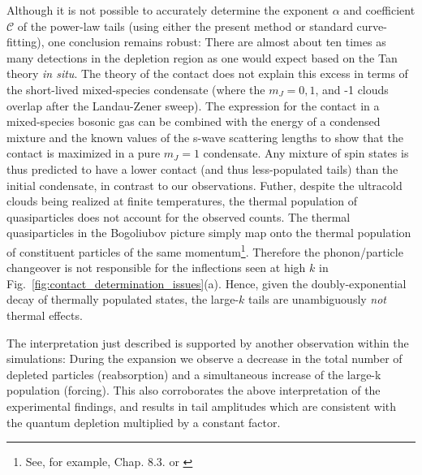 {	Although it is not possible to accurately determine the  exponent $\alpha$ and coefficient $\mathcal{C}$ of the power-law tails (using either the present method or standard curve-fitting), one conclusion remains robust: There are {almost} about ten times as many detections in the depletion region as one would expect based on the Tan theory {\emph{in situ}}. 
	The theory of the contact does not explain this excess in terms of the short-lived mixed-species condensate (where the $m_J=0,1$, and -1 clouds overlap after the Landau-Zener sweep). 
	The expression for the contact in a mixed-species bosonic gas \cite{Werner12_boson} can be combined with the energy of a condensed mixture \cite{PethickSmith} and the known values of the s-wave scattering lengths \cite{Vassen16} to show that the contact is maximized in a pure $m_J=1$ condensate.
	Any mixture of spin states is thus predicted to have a lower contact (and thus less-populated tails) than the initial condensate, in contrast to our observations.
	Futher, despite the ultracold clouds being realized at finite temperatures, the thermal population of quasiparticles does not account for the observed counts. 
	The thermal quasiparticles in the Bogoliubov picture simply map onto the thermal population of constituent particles of the same momentum\footnote{See, for example, \cite{PethickSmith} Chap. 8.3. or \cite{Vogels02}}. 
	{Therefore the phonon/particle changeover is not responsible for the inflections seen at high $k$ in Fig.~\ref{fig:contact_determination_issues}(a).} 
	Hence, given the doubly-exponential decay of thermally populated states, the large-$k$ tails are unambiguously \emph{not} thermal effects. 
	
	
	The interpretation just described is supported by another observation within the simulations:
	During the expansion we observe a decrease in the total number of depleted particles (reabsorption) and a simultaneous increase of the large-k population (forcing). 
	This {also corroborates the above interpretation} %
	of the experimental findings, and results in tail amplitudes which are consistent with the quantum depletion multiplied by a constant factor. 
	
}
